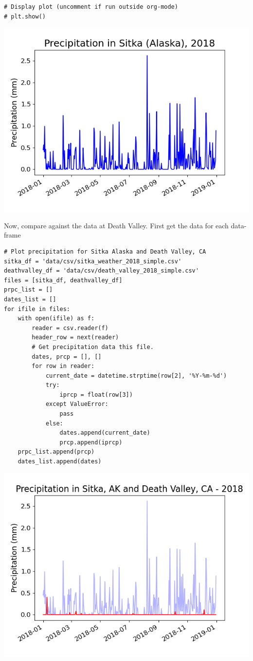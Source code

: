\documentclass[10pt]{book}
\begin{document}
\begin{enumerate}
\begin{verbatim}
# Display plot (uncomment if run outside org-mode)
# plt.show()
\end{verbatim}

\begin{center}
\includegraphics[width=.9\linewidth]{output/images/Rainfall_1.png}
\label{org0d261f7}
\end{center}

Now, compare against the data at Death Valley. First get the data for each data-frame
\begin{verbatim}
# Plot precipitation for Sitka Alaska and Death Valley, CA
sitka_df = 'data/csv/sitka_weather_2018_simple.csv'
deathvalley_df = 'data/csv/death_valley_2018_simple.csv'
files = [sitka_df, deathvalley_df]
prpc_list = []
dates_list = []
for ifile in files:
    with open(ifile) as f:
        reader = csv.reader(f)
        header_row = next(reader)
        # Get precipitation data this file.
        dates, prcp = [], []
        for row in reader:
            current_date = datetime.strptime(row[2], '%Y-%m-%d')
            try:
                iprcp = float(row[3])
            except ValueError:
                pass
            else:
                dates.append(current_date)
                prcp.append(iprcp)
    prpc_list.append(prcp)
    dates_list.append(dates)
\end{verbatim}

\begin{center}
\includegraphics[width=.9\linewidth]{output/images/Rainfall_2.png}
\label{org3797bbe}
\end{center}


\end{enumerate}
\end{document}
